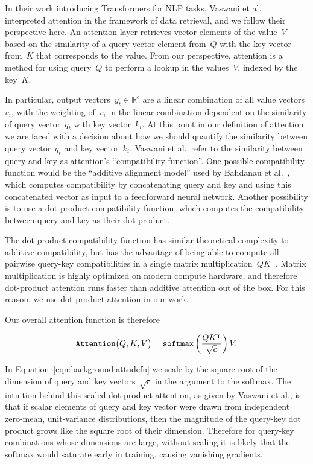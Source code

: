 In their work introducing Transformers for NLP tasks, Vaswani et
al.~\cite{vaswani2017attention} interpreted attention in the framework of data
retrieval, and we follow their perspective here.
An attention layer retrieves vector elements of the value~$V$ based on the
similarity of a query vector element from~$Q$ with the key vector from~$K$ that
corresponds to the value.
From our perspective, attention is a method for using query~$Q$ to perform a
lookup in the values~$V$, indexed by the key~$K$.

In particular, output vectors~$y_t \in \mathbb{R}^c$ are a linear combination
of all value vectors~$v_i$, with the weighting of~$v_i$ in the linear
combination dependent on the similarity of query vector~$q_t$ with key
vector~$k_i$.
At this point in our definition of attention we are faced with a decision about
how we should quantify the similarity between query vector~$q_t$ and key
vector~$k_i$.
Vaswani et al.\ refer to the similarity between query and key as attention's
``compatibility function''.
One possible compatibility function would be the ``additive alignment model''
used by Bahdanau et al.~\cite{bahdanau2015neuralmt}, which computes
compatibility by concatenating query and key and using this concatenated vector
as input to a feedforward neural network.
Another possibility is to use a dot-product compatibility function, which
computes the compatibility between query and key as their dot product.

The dot-product compatibility function has similar theoretical complexity to
additive compatibility, but has the advantage of being able to compute all
pairwise query-key compatibilities in a single matrix
multiplication~$QK^\intercal$.
Matrix multiplication is highly optimized on modern compute hardware, and
therefore dot-product attention runs faster than additive attention out of the
box.
For this reason, we use dot product attention in our work.

Our overall attention function is therefore

\begin{equation}
\mathtt{Attention}\big(Q, K, V\big) = \mathtt{softmax}{}\left(\frac{QK^\intercal}{\sqrt{c}}\right) V.
\label{eqn:background:attndefn}
\end{equation}

In Equation~\ref{eqn:background:attndefn} we scale by the square root of the
dimension of query and key vectors~$\sqrt{c}$ in the argument to the softmax.
The intuition behind this scaled dot product attention, as given by Vaswani et
al., is that if scalar elements of query and key vector were drawn from
independent zero-mean, unit-variance distributions, then the magnitude of the
query-key dot product grows like the square root of their dimension.
Therefore for query-key combinations whose dimensions are large, without
scaling it is likely that the softmax would saturate early in training, causing
vanishing gradients.


